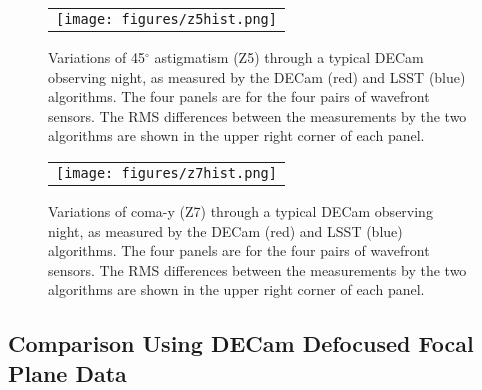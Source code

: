 \documentclass[]{spie}  %
\begin{document}
   \begin{figure} [tbph]
   \begin{center}
   \begin{tabular}{c} %
   \texttt{[image: figures/z5hist.png]}
   \end{tabular}
   \end{center}
   \caption[example] 
   { \label{fig:z5hist} 
Variations of 45$^\circ$ astigmatism (Z5) through a typical DECam observing night, as measured by the DECam (red) and LSST (blue) algorithms. The four panels are for the four pairs of wavefront sensors.
The RMS differences between the measurements by the two algorithms are shown in the upper right corner of each panel. 
}
   \end{figure} 

   \begin{figure} [tbph]
   \begin{center}
   \begin{tabular}{c} %
   \texttt{[image: figures/z7hist.png]}
   \end{tabular}
   \end{center}
   \caption[example] 
   { \label{fig:z7hist} 
Variations of coma-y (Z7) through a typical DECam observing night, as measured by the DECam (red) and LSST (blue) algorithms. The four panels are for the four pairs of wavefront sensors.
The RMS differences between the measurements by the two algorithms are shown in the upper right corner of each panel. 
}
   \end{figure} 


\subsection{Comparison Using DECam Defocused Focal Plane Data}
\end{document}
